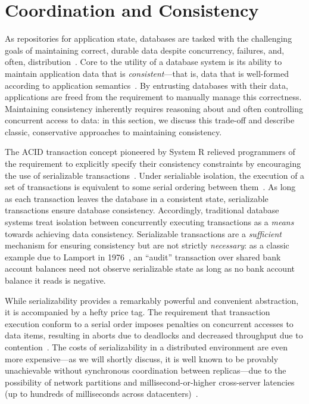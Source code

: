 
\section{Coordination and Consistency}
\label{sec:motivation}


As repositories for application state, databases are tasked with the
challenging goals of maintaining correct, durable data despite
concurrency, failures, and, often,
distribution~\cite{bernstein-book}. Core to the utility of a database
system is its ability to maintain application data that is
\textit{consistent}---that is, data that is well-formed according to
application semantics~\cite{gray-virtues}. By entrusting databases
with their data, applications are freed from the requirement to
manually manage this correctness. Maintaining consistency inherently
requires reasoning about and often controlling concurrent access to
data: in this section, we discuss this trade-off and describe classic,
conservative approaches to maintaining consistency.


 The ACID transaction concept
pioneered by System R relieved programmers of the requirement to
explicitly specify their consistency constraints by encouraging the
use of serializable transactions~\cite{gray-virtues}. Under
serialiable isolation, the execution of a set of transactions is
equivalent to some serial ordering between
them~\cite{bernstein-book}. As long as each transaction leaves the
database in a consistent state, serializable transactions ensure
database consistency. Accordingly, traditional database systems treat
isolation between concurrently executing transactions as a
\textit{means} towards achieving data consistency. Serializable
transactions are a \textit{sufficient} mechanism for ensuring
consistency but are not strictly \textit{necessary}: as a classic
example due to Lamport in 1976~\cite{lamport-audit}, an ``audit''
transaction over shared bank account balances need not observe
serializable state as long as no bank account balance it reads is
negative.


While serializability provides a remarkably powerful and convenient
abstraction, it is accompanied by a hefty price tag. The requirement
that transaction execution conform to a serial order imposes penalties
on concurrent accesses to data items, resulting in aborts due to
deadlocks and decreased throughput due to
contention~\cite{bernstein-book,gray-book,gray-virtues}. The costs of
serializability in a distributed environment are even more
expensive---as we will shortly discuss, it is well known to be
provably unachievable without synchronous coordination between
replicas---due to the possibility of network partitions and
millisecond-or-higher cross-server latencies (up to hundreds of
milliseconds across datacenters)~\cite{hat-vldb,bobtail}.

